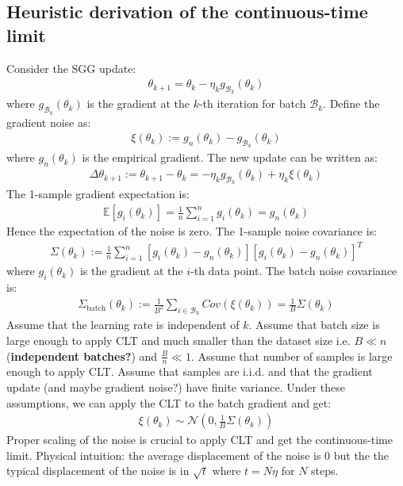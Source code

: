 \documentclass[11pt]{article}
\begin{document}
\subsection{Heuristic derivation of the continuous-time limit}
Consider the SGG update:
\begin{align}
\theta_{k+1} = \theta_k - \eta_k g_{\mathcal{B}_k}(\theta_k)
\end{align}
where $g_{\mathcal{B}_k}(\theta_k)$ is the gradient at the $k$-th iteration for batch $\mathcal{B}_k$.
Define the gradient noise as:
\begin{align}
\xi(\theta_k) := g_n(\theta_k) - g_{\mathcal{B}_k}(\theta_k)
\end{align}
where $g_n(\theta_k)$ is the empirical gradient.
The new update can be written as:
\begin{align}
\Delta\theta_{k+1} := \theta_{k+1} - \theta_k = - \eta_k g_{\mathcal{B}_k}(\theta_k) + \eta_k \xi(\theta_k)
\end{align}
The 1-sample gradient expectation is:
\begin{align}
\mathbb{E}[g_i(\theta_k)] = \frac{1}{n} \sum_{i=1}^n g_i(\theta_k) = g_n(\theta_k)
\end{align}
Hence the expectation of the noise is zero.
The 1-sample noise covariance is:
\begin{align}
\Sigma(\theta_k) := \frac{1}{n} \sum_{i=1}^n [g_i(\theta_k) - g_n(\theta_k)][g_i(\theta_k) - g_n(\theta_k)]^T
\end{align}
where $g_i(\theta_k)$ is the gradient at the $i$-th data point. The batch noise covariance is:
\begin{align}
\Sigma_{\text{batch}}(\theta_k) := \frac{1}{B^2}\sum_{i\in\mathcal{B}_k} Cov(\xi(\theta_k)) = \frac{1}{B}\Sigma(\theta_k)
\end{align}
Assume that the learning rate is independent of $k$. Assume that batch size is large enough to apply CLT and much smaller than the dataset size i.e. $B \ll n$ (\textbf{independent batches?}) and $\frac{B}{n} \ll 1$. Assume that number of samples is large enough to apply CLT. Assume that samples are i.i.d. and that the gradient update (and maybe gradient noise?) have finite variance. Under these assumptions, we can apply the CLT to the batch gradient and get:
\begin{align}
\xi(\theta_k) \sim \mathcal{N}(0, \frac{1}{B}\Sigma(\theta_k))
\end{align}
Proper scaling of the noise is crucial to apply CLT and get the continuous-time limit.
Physical intuition: the average displacement of the noise is 0 but the the typical displacement of the noise is in $\sqrt{t}$ where $t = N\eta$ for $N$ steps.
\end{document}
